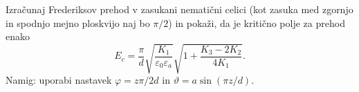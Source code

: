 \begin{naloga}
Izračunaj Frederiksov prehod v zasukani nematični celici (kot zasuka med zgornjo in spodnjo 
mejno ploskvijo naj bo $\pi/2$) in pokaži, da je kritično polje za prehod enako
\begin{equation}
E_c =  \frac{\pi}{d}\sqrt{\frac{K_1}{\varepsilon_0\varepsilon_a}}
\sqrt{1 + \frac{K_3-2K_2}{4K_1}}.
\end{equation}
Namig: uporabi nastavek $\varphi = z \pi/2d$ in $\vartheta = a \sin(\pi z/d)$. 
\end{naloga}
